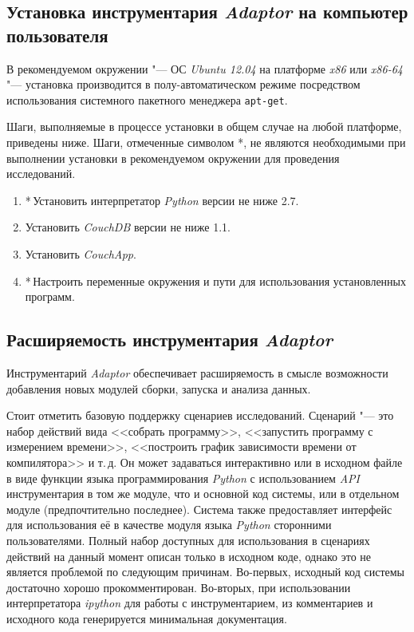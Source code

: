 \subsection{Установка инструментария \textit{Adaptor} на компьютер пользователя}
В рекомендуемом окружении "--- ОС \textit{Ubuntu 12.04} на платформе \textit{x86} или \textit{x86-64} "--- установка производится в полу-автоматическом режиме посредством использования системного пакетного менеджера \texttt{apt-get}.

Шаги, выполняемые в процессе установки в общем случае на любой платформе, приведены ниже. Шаги, отмеченные символом {*}, не являются необходимыми при выполнении установки в рекомендуемом окружении для проведения исследований.

\begin{enumerate}
    \item*\,Установить интерпретатор \textit{Python} версии не ниже 2.7.
    \item Установить \textit{CouchDB} версии не ниже 1.1.
    \item Установить \textit{CouchApp}.
    \item*\,Настроить переменные окружения и пути для использования установленных программ.
\end{enumerate}


\subsection{Расширяемость инструментария \textit{Adaptor}}
Инструментарий \textit{Adaptor} обеспечивает расширяемость в смысле возможности добавления новых модулей сборки, запуска и анализа данных.

Стоит отметить базовую поддержку сценариев исследований. Сценарий "--- это набор действий вида <<собрать программу>>, <<запустить программу с измерением времени>>, <<построить график зависимости времени от компилятора>> и т.\,д. Он может задаваться интерактивно или в исходном файле в виде функции языка программирования \textit{Python} с использованием \textit{API} инструментария в том же модуле, что и основной код системы, или в отдельном модуле (предпочтительно последнее). Система также предоставляет интерфейс для использования её в качестве модуля языка \textit{Python} сторонними пользователями. Полный набор доступных для использования в сценариях действий на данный момент описан только в исходном коде, однако это не является проблемой по следующим причинам. Во-первых, исходный код системы достаточно хорошо прокомментирован. Во-вторых, при использовании интерпретатора \textit{ipython} для работы с инструментарием, из комментариев и исходного кода генерируется минимальная документация.


